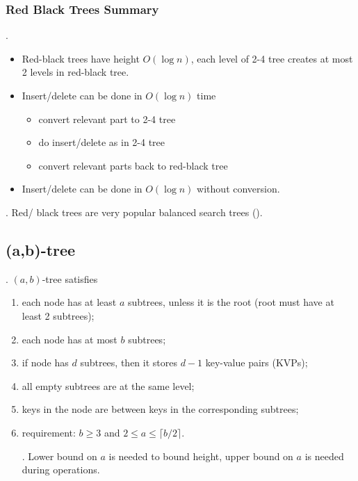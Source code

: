 \documentclass{article}
\begin{document}
\subsubsection{Red Black Trees Summary} 

\begin{result}[].
    \begin{itemize}
        \item Red-black trees have height $O(\log n)$, each level of 2-4 tree creates at most 2 levels in red-black tree. 
        \item Insert/delete can be done in $O(\log n)$ time \begin{itemize}
            \item convert relevant part to 2-4 tree 
            \item do insert/delete as in 2-4 tree 
            \item convert relevant parts back to red-black tree
        \end{itemize}
        \item Insert/delete can be done in $O(\log n)$ without conversion. 
    \end{itemize} 
\end{result}

\begin{comm}[].
    Red/ black trees are very popular balanced search trees ().
\end{comm}

\newpage

\subsection{(a,b)-tree} 

\begin{deff}.
    $(a,b)$-tree satisfies \begin{enumerate}
        \item each node has at least $a$ subtrees, unless it is the root (root must have at least 2 subtrees); 
        \item each node has at most $b$ subtrees; 
        \item if node has $d$ subtrees, then it stores $d-1$ key-value pairs (KVPs); 
        \item all empty subtrees are at the same level; 
        \item keys in the node are between keys in the corresponding  subtrees; 
        \item requirement: $b \geq 3$ and $2 \leq a \leq \lceil b/2 \rceil$. 
        \begin{comm}[].
            Lower bound on $a$ is needed to bound height, upper bound on $a$ is needed during operations. 
        \end{comm}
    \end{enumerate}
\end{deff}
\end{document}
